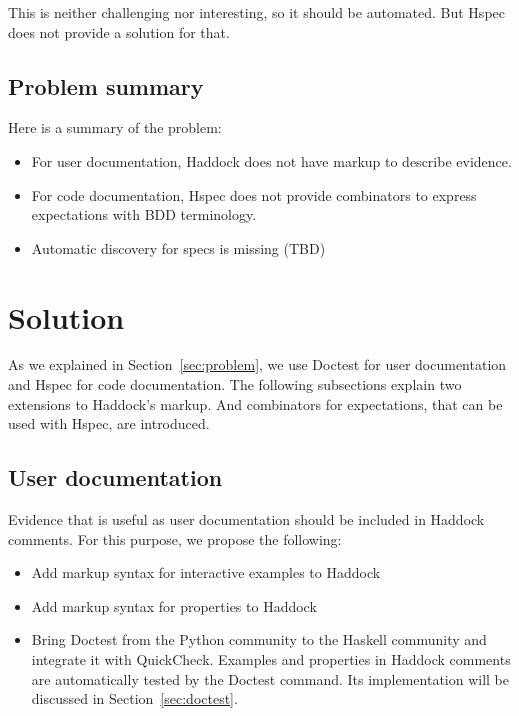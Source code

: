 \documentclass[preprint]{sigplanconf}
\begin{document}
\noindent This is neither challenging nor interesting, so it should be
automated.  But Hspec does not provide a solution for that.

\subsection{Problem summary}

Here is a summary of the problem:

\begin{itemize}
\item
    For user documentation,
    Haddock does not have markup to describe evidence.
\item
    For code documentation,
    Hspec does not provide combinators to express expectations with
    BDD terminology.
\item
    Automatic discovery for specs is missing (TBD)
\end{itemize}

\section{Solution}

As we explained in Section~\ref{sec:problem},
we use Doctest for user documentation and Hspec for code documentation.
The following subsections explain two extensions to Haddock's markup.
And combinators for expectations, that can be used with Hspec, are
introduced.

\subsection{User documentation}
\label{sec:user-doc}



Evidence that is useful as user documentation should be included in
Haddock comments.  For this purpose, we propose the following:

\begin{itemize}
\item Add markup syntax for interactive examples to Haddock
\item Add markup syntax for properties to Haddock
\item Bring Doctest from the Python community to the Haskell
community and integrate it with QuickCheck.
Examples and properties in Haddock comments are automatically
tested by the Doctest command.
Its implementation will be discussed in Section~\ref{sec:doctest}.

\end{itemize}
\end{document}
